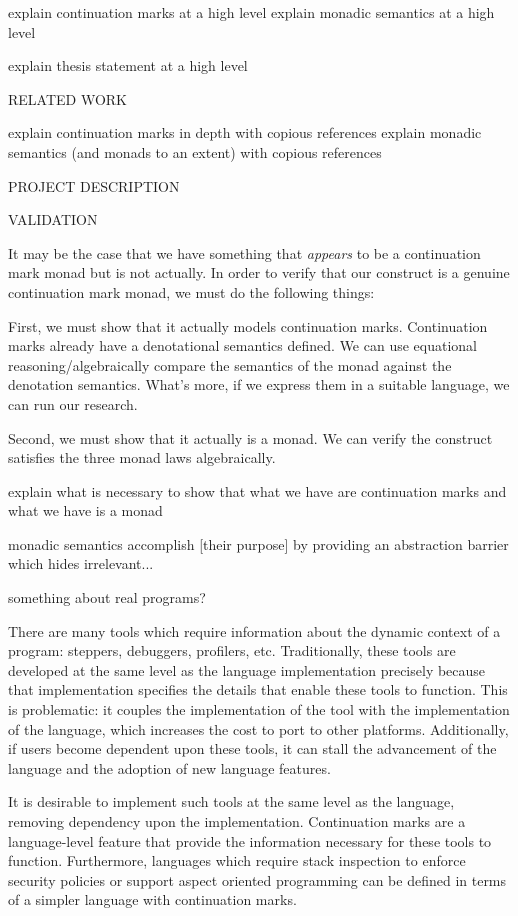 \documentclass[ms]{byuprop}
\begin{document}
explain continuation marks at a high level \cite{clements2006portable}
explain monadic semantics at a high level

explain thesis statement at a high level

RELATED WORK

explain continuation marks in depth with copious references
explain monadic semantics (and monads to an extent) with copious references

PROJECT DESCRIPTION


VALIDATION

It may be the case that we have something that \emph{appears} to be a continuation mark monad but is not actually. In order to verify that our construct is a genuine continuation mark monad, we must do the following things:

First, we must show that it actually models continuation marks. Continuation marks already have a denotational semantics defined. We can use equational reasoning/algebraically compare the semantics of the monad against the denotation semantics. What's more, if we express them in a suitable language, we can run our research.

Second, we must show that it actually is a monad. We can verify the construct satisfies the three monad laws algebraically.

explain what is necessary to show that what we have are continuation marks and what we have is a monad

monadic semantics accomplish [their purpose] by providing an abstraction barrier which hides irrelevant...



something about real programs?

There are many tools which require information about the dynamic context of a program: steppers, debuggers, profilers, etc. Traditionally, these tools are developed at the same level as the language implementation precisely because that implementation specifies the details that enable these tools to function. This is problematic: it couples the implementation of the tool with the implementation of the language, which increases the cost to port to other platforms. Additionally, if users become dependent upon these tools, it can stall the advancement of the language and the adoption of new language features.

It is desirable to implement such tools at the same level as the language, removing dependency upon the implementation. Continuation marks are a language-level feature that provide the information necessary for these tools to function. Furthermore, languages which require stack inspection to enforce security policies or support aspect oriented programming can be defined in terms of a simpler language with continuation marks.
\end{document}
